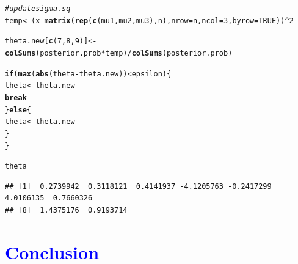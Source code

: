 \documentclass[11pt, a4paper]{article}\usepackage[]{graphicx}\usepackage[]{xcolor}
\makeatletter
\newcommand{\hlnum}[1]{\textcolor[rgb]{0.686,0.059,0.569}{#1}}%
\newcommand{\hlcom}[1]{\textcolor[rgb]{0.678,0.584,0.686}{\textit{#1}}}%
\newcommand{\hlopt}[1]{\textcolor[rgb]{0,0,0}{#1}}%
\newcommand{\hldef}[1]{\textcolor[rgb]{0.345,0.345,0.345}{#1}}%
\newcommand{\hlkwa}[1]{\textcolor[rgb]{0.161,0.373,0.58}{\textbf{#1}}}%
\newcommand{\hlkwb}[1]{\textcolor[rgb]{0.69,0.353,0.396}{#1}}%
\newcommand{\hlkwc}[1]{\textcolor[rgb]{0.333,0.667,0.333}{#1}}%
\newcommand{\hlkwd}[1]{\textcolor[rgb]{0.737,0.353,0.396}{\textbf{#1}}}%
\newenvironment{kframe}{%
 \def\at@end@of@kframe{}%
 \ifinner\ifhmode%
  \def\at@end@of@kframe{\end{minipage}}%
  \begin{minipage}{\columnwidth}%
 \fi\fi%
 \def\FrameCommand##1{\hskip\@totalleftmargin \hskip-\fboxsep
 \colorbox{shadecolor}{##1}\hskip-\fboxsep
     \hskip-\linewidth \hskip-\@totalleftmargin \hskip\columnwidth}%
 \MakeFramed {\advance\hsize-\width
   \@totalleftmargin\z@ \linewidth\hsize
   \@setminipage}}%
 {\par\unskip\endMakeFramed%
 \at@end@of@kframe}
\newenvironment{knitrout}{}{} %
\makeatother
\begin{document}
\begin{enumerate}
\begin{knitrout}
\begin{kframe}
\begin{alltt}
  \hlcom{# update sigma.sq}
  \hldef{temp} \hlkwb{<-} \hldef{(x} \hlopt{-} \hlkwd{matrix}\hldef{(}\hlkwd{rep}\hldef{(}\hlkwd{c}\hldef{(mu1, mu2, mu3), n),} \hlkwc{nrow} \hldef{= n,} \hlkwc{ncol} \hldef{=} \hlnum{3}\hldef{,} \hlkwc{byrow} \hldef{=} \hlnum{TRUE}\hldef{))}\hlopt{^}\hlnum{2}

  \hldef{theta.new[}\hlkwd{c}\hldef{(}\hlnum{7}\hldef{,} \hlnum{8}\hldef{,} \hlnum{9}\hldef{)]} \hlkwb{<-} \hlkwd{colSums}\hldef{(posterior.prob} \hlopt{*} \hldef{temp)} \hlopt{/} \hlkwd{colSums}\hldef{(posterior.prob)}

  \hlkwa{if}\hldef{(}\hlkwd{max}\hldef{(}\hlkwd{abs}\hldef{(theta} \hlopt{-} \hldef{theta.new))} \hlopt{<} \hldef{epsilon)\{}
    \hldef{theta} \hlkwb{<-} \hldef{theta.new}
    \hlkwa{break}
  \hldef{\}}\hlkwa{else}\hldef{\{}
    \hldef{theta} \hlkwb{<-} \hldef{theta.new}
  \hldef{\}}
\hldef{\}}
\end{alltt}
\end{kframe}
\end{knitrout}

\begin{knitrout}
\color{fgcolor}\begin{kframe}
\begin{alltt}
\hldef{theta}
\end{alltt}
\begin{verbatim}
## [1]  0.2739942  0.3118121  0.4141937 -4.1205763 -0.2417299  4.0106135  0.7660326
## [8]  1.4375176  0.9193714
\end{verbatim}
\end{kframe}
\end{knitrout}

\end{enumerate}

\newpage

\section*{\faArrowAltCircleRight[regular] \textcolor{blue}{Conclusion}}
\end{document}
